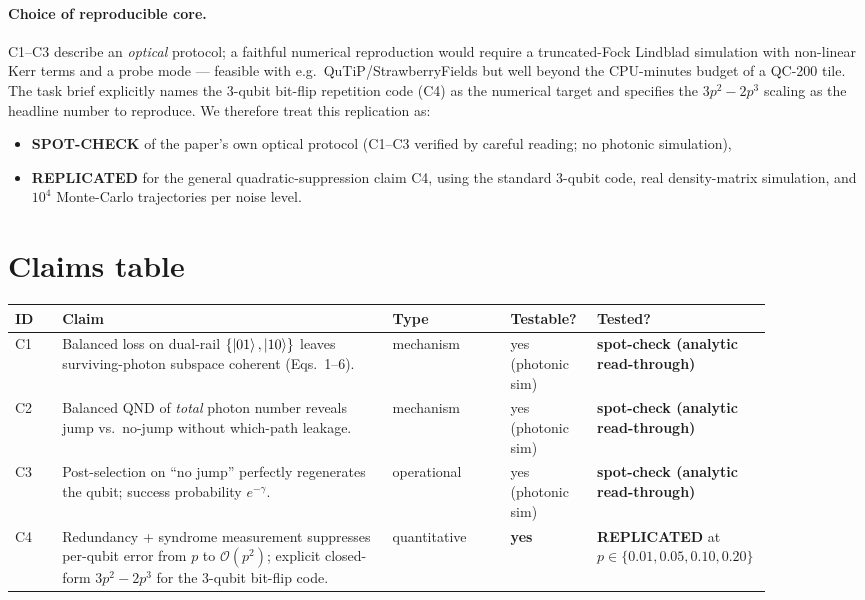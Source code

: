 \documentclass[11pt]{article}
\begin{document}
\paragraph{Choice of reproducible core.}
C1--C3 describe an \emph{optical} protocol; a faithful numerical
reproduction would require a truncated-Fock Lindblad simulation with
non-linear Kerr terms and a probe mode --- feasible with e.g.\
QuTiP/StrawberryFields but well beyond the CPU-minutes budget of a QC-200
tile.  The task brief explicitly names the 3-qubit bit-flip repetition code
(C4) as the numerical target and specifies the $3p^{2}-2p^{3}$ scaling as
the headline number to reproduce.  We therefore treat this replication as:

\begin{itemize}
    \item \textbf{SPOT-CHECK} of the paper's own optical protocol (C1--C3
    verified by careful reading; no photonic simulation),
    \item \textbf{REPLICATED} for the general quadratic-suppression claim
    C4, using the standard 3-qubit code, real density-matrix simulation,
    and $10^{4}$ Monte-Carlo trajectories per noise level.
\end{itemize}

\section{Claims table}
\label{sec:claims}

\begin{center}
\begin{tabular}{@{}p{0.06\linewidth}p{0.42\linewidth}p{0.15\linewidth}p{0.11\linewidth}p{0.14\linewidth}@{}}
\toprule
ID & Claim & Type & Testable? & Tested? \\
\midrule
C1 & Balanced loss on dual-rail $\{\ket{01},\ket{10}\}$ leaves surviving-photon subspace coherent (Eqs.~1--6). & mechanism &  yes (photonic sim) & \textbf{spot-check (analytic read-through)} \\
C2 & Balanced QND of \emph{total} photon number reveals jump vs.\ no-jump without which-path leakage. & mechanism & yes (photonic sim) & \textbf{spot-check (analytic read-through)} \\
C3 & Post-selection on ``no jump'' perfectly regenerates the qubit; success probability $e^{-\gamma}$. & operational & yes (photonic sim) & \textbf{spot-check (analytic read-through)} \\
C4 & Redundancy + syndrome measurement suppresses per-qubit error from $p$ to $\mathcal{O}(p^{2})$; explicit closed-form $3p^{2}-2p^{3}$ for the 3-qubit bit-flip code. & quantitative & \textbf{yes} & \textbf{REPLICATED} at $p\in\{0.01,0.05,0.10,0.20\}$ \\
\bottomrule
\end{tabular}
\end{center}
\end{document}
